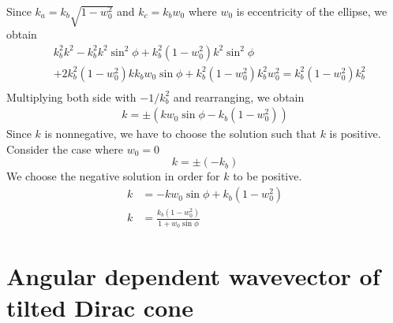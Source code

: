    Since $k_a = k_b \sqrt{1-w_0^2}$ and $k_c = k_b w_0$ where $w_0$ is eccentricity of the ellipse, we obtain
    \begin{equation}
        \begin{aligned}
            &k_b^2 k^2 - k_b^2 k^2 \sin^2{\phi} + k_b^2 (1-w_0^2)k^2 \sin^2{\phi}\\
            &+2 k_b^2 (1-w_0^2) k k_b w_0 \sin{\phi} +k_b^2 (1-w_0^2) k_b^2 w_0^2=k_b^2 (1-w_0^2) k_b^2\\
        \end{aligned}
    \end{equation}
    Multiplying both side with $-1/k_b^2$ and rearranging, we obtain
    \begin{align} 
        k = \pm (k w_0 \sin{\phi} - k_b(1-w_0^2))
    \end{align}
    Since $k$ is nonnegative, we have to choose the solution such that $k$ is positive.
    Consider the case where $w_0 = 0$
    $$
    k = \pm (-k_b)
    $$
    We choose the negative solution in order for $k$ to be positive.
    \begin{equation}
    \begin{aligned} \label{eq:k vs phi}
        k &= -k w_0 \sin{\phi}+ k_b (1-w_0^2)\\
        k &= \frac{k_b(1-w_0^2)}{1+w_0 \sin{\phi}}
    \end{aligned}
    \end{equation}

\section{Angular dependent wavevector of tilted Dirac cone} \label{sec:k angular dependent k}
     
